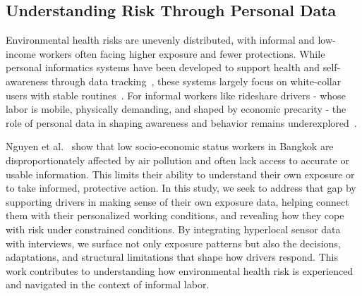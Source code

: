 


\subsection{Understanding Risk Through Personal Data}

Environmental health risks are unevenly distributed, with informal and low-income workers often facing higher exposure and fewer protections. 
While personal informatics systems have been developed to support health and self-awareness through data tracking~\cite{li2010stage}, these systems largely focus on white-collar users with stable routines~\cite{epstein2020}. 
For informal workers like rideshare drivers - whose labor is mobile, physically demanding, and shaped by economic precarity - the role of personal data in shaping awareness and behavior remains underexplored~\cite{slater2022air}.

Nguyen et al.~\cite{nguyen2023bangkokpollution} show that low socio-economic status workers in Bangkok are disproportionately affected by air pollution and often lack access to accurate or usable information. 
This limits their ability to understand their own exposure or to take informed, protective action. 
In this study, we seek to address that gap by supporting drivers in making sense of their own exposure data, helping connect them with their personalized working conditions, and revealing how they cope with risk under constrained conditions. 
By integrating hyperlocal sensor data with interviews, we surface not only exposure patterns but also the decisions, adaptations, and structural limitations that shape how drivers respond. 
This work contributes to understanding how environmental health risk is experienced and navigated in the context of informal labor.


